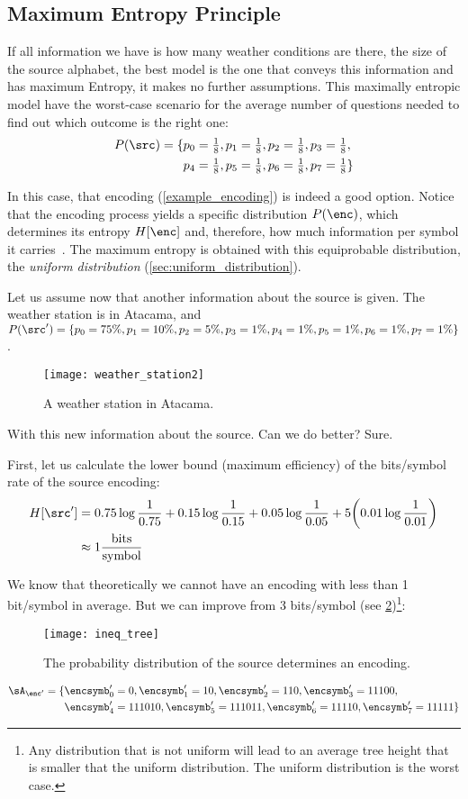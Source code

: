\subsection{Maximum Entropy Principle}
If all information we have is how many weather conditions are there, the size of the source alphabet, the best model is the one that conveys this information and has maximum Entropy, \ie{}it makes no further assumptions. This maximally entropic model have the worst-case scenario for the average number of questions needed to find out which outcome is the right one:
\begin{align}
	P({\src}) = \{&p_0=\tfrac{1}{8},p_1=\tfrac{1}{8},p_2=\tfrac{1}{8},p_3=\tfrac{1}{8}, \nonumber \\
	&p_4=\tfrac{1}{8},p_5=\tfrac{1}{8},p_6=\tfrac{1}{8},p_7=\tfrac{1}{8}\}
\end{align}

In this case, that encoding (\eqref{example_encoding}) is indeed a good option.
Notice that the encoding process yields a specific distribution \(P(\enc)\), which determines its entropy \(H[\enc]\) and, therefore, how much information per symbol it carries~\cite{stone:2015}. The maximum entropy is obtained with this equiprobable distribution, the \emph{uniform distribution} (\cref{sec:uniform_distribution}).

Let us assume now that another information about the source is given. The weather station is in Atacama, and \(P({\src'}) = \{p_0=75\%,p_1=10\%,p_2=5\%,p_3=1\%, p_4=1\%,p_5=1\%,p_6=1\%,p_7=1\% \}\).
\begin{figure}
	[ht!] \centering
	\texttt{[image: weather\_station2]}
	\caption{A weather station in Atacama.}\label{fig:atacama} \end{figure}
With this new information about the source. Can we do better? Sure.

First, let us calculate the lower bound (maximum efficiency) of the bits/symbol rate of the source encoding:
\begin{align}
	H[\src']&= 0.75 \log \frac{1}{0.75} + 0.15 \log \frac{1}{0.15} + 0.05 \log \frac{1}{0.05} + 5\biggl(0.01 \log \frac{1}{0.01}\biggr) \nonumber \\
	&\approx 1 \frac{\text{bits}}{\text{symbol}}
\end{align}

We know that theoretically we cannot have an encoding with less than 1 bit/symbol in average. But we can improve from 3 bits/symbol (see \cref{fig:inequi_tree})\footnote{Any distribution that is not uniform will lead to an average tree height that is smaller that the uniform distribution. The uniform distribution is the worst case.}:
\begin{figure}
	[hbt!] \centering
	\texttt{[image: ineq\_tree]}
	\caption{The probability distribution of the source determines an encoding.}\label{fig:inequi_tree} \end{figure}
\begin{align}
	\sA_{\enc'} = \{&\encsymb'_0=0, \encsymb'_1=10, \encsymb'_2=110, \encsymb'_3=11100,\nonumber \\
	&\encsymb'_4=111010, \encsymb'_5=111011, \encsymb'_6=11110, \encsymb'_7=11111\}
\end{align}

